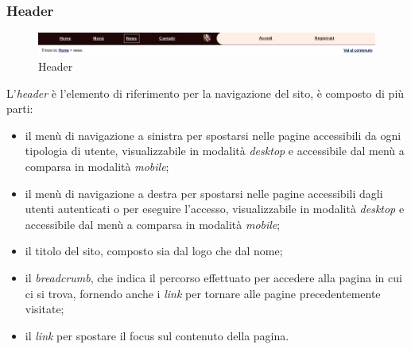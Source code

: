 \documentclass{template}
\begin{document}
	\subsubsection{Header} \label{header}

	\begin{figure}[H]
		\centering
		\includegraphics[scale=0.3]{src/header.png}
		\caption{Header}
	\end{figure}

	L'\textit{header} è l'elemento di riferimento per la navigazione del sito, è composto di più parti:
	\begin{itemize}
		\item il menù di navigazione a sinistra per spostarsi nelle pagine accessibili da ogni tipologia di utente, visualizzabile in modalità \textit{desktop} e accessibile dal menù a comparsa in modalità \textit{mobile};
		\item il menù di navigazione a destra per spostarsi nelle pagine accessibili dagli utenti autenticati o per eseguire l'accesso, visualizzabile in modalità \textit{desktop} e accessibile dal menù a comparsa in modalità \textit{mobile};
		\item il titolo del sito, composto sia dal logo che dal nome;
		\item il \textit{breadcrumb}, che indica il percorso effettuato per accedere alla pagina in cui ci si trova, fornendo anche i \textit{link} per tornare alle pagine precedentemente visitate;
		\item il \textit{link} per spostare il focus sul contenuto della pagina.
	\end{itemize}
	
\end{document}
